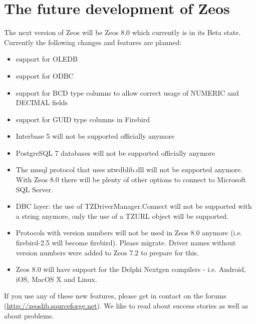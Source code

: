 \documentclass[a4paper,12pt,oneside]{book}
\begin{document}
\chapter{The future development of Zeos}
\label{chap:FutureDevelopmentOfZeosRev}
The next version of Zeos will be Zeos 8.0 which currently is in its Beta state.
Currently the following changes and features are planned:
\begin{itemize}
\item support for OLEDB
\item support for ODBC
\item support for BCD type columns to allow correct usage of NUMERIC and DECIMAL fields
\item support for GUID type columns in Firebird
\item Interbase 5 will not be supported officially anymore
\item PostgreSQL 7 databases will not be supported officially anymore
\item 
  The mssql protocol that uses ntwdblib.dll will not be supported anymore.
  With Zeos 8.0 there will be plenty of other options to connect to Microsoft SQL Server.
\item DBC layer: the use of TZDriverManager.Connect will not be supported with a string anymore, only the use of a TZURL object will be supported.
\item
  Protocols with version numbers will not be used in Zeos 8.0 anymore (i.e. firebird-2.5 will become firebird).
  Please migrate.
  Driver names without version numbers were added to Zeos 7.2 to prepare for this.
\item
  Zeos 8.0 will have support for the Delphi Nextgen compilers - i.e. Android, iOS, MacOS X and Linux.
\end{itemize}
If you use any of these new features, please get in contact on the forums (\url{http://zeoslib.sourceforge.net}).
We like to read about success stories as well as about problems.
\end{document}
